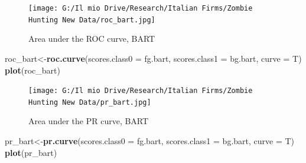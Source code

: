 \documentclass[]{article}
\newenvironment{Shaded}{\begin{snugshade}}{\end{snugshade}}
\newcommand{\CommentTok}[1]{\textcolor[rgb]{0.56,0.35,0.01}{\textit{#1}}}
\newcommand{\DataTypeTok}[1]{\textcolor[rgb]{0.13,0.29,0.53}{#1}}
\newcommand{\DecValTok}[1]{\textcolor[rgb]{0.00,0.00,0.81}{#1}}
\newcommand{\FloatTok}[1]{\textcolor[rgb]{0.00,0.00,0.81}{#1}}
\newcommand{\KeywordTok}[1]{\textcolor[rgb]{0.13,0.29,0.53}{\textbf{#1}}}
\newcommand{\NormalTok}[1]{#1}
\newcommand{\OperatorTok}[1]{\textcolor[rgb]{0.81,0.36,0.00}{\textbf{#1}}}
\newcommand{\StringTok}[1]{\textcolor[rgb]{0.31,0.60,0.02}{#1}}
\begin{document}
\begin{Shaded}
\end{Shaded}

\begin{figure}
\centering
\texttt{[image: G:/Il mio Drive/Research/Italian Firms/Zombie Hunting New Data/roc\_bart.jpg]}
\caption{Area under the ROC curve, BART}
\end{figure}

\begin{Shaded}
\begin{Highlighting}[]
\NormalTok{roc_bart<-}\KeywordTok{roc.curve}\NormalTok{(}\DataTypeTok{scores.class0 =}\NormalTok{ fg.bart,}
                    \DataTypeTok{scores.class1 =}\NormalTok{ bg.bart,}
                    \DataTypeTok{curve =}\NormalTok{ T)}
\KeywordTok{plot}\NormalTok{(roc_bart)}
\end{Highlighting}
\end{Shaded}

\begin{figure}
\centering
\texttt{[image: G:/Il mio Drive/Research/Italian Firms/Zombie Hunting New Data/pr\_bart.jpg]}
\caption{Area under the PR curve, BART}
\end{figure}

\begin{Shaded}
\begin{Highlighting}[]
\NormalTok{pr_bart<-}\KeywordTok{pr.curve}\NormalTok{(}\DataTypeTok{scores.class0 =}\NormalTok{ fg.bart,}
                  \DataTypeTok{scores.class1 =}\NormalTok{ bg.bart,}
                  \DataTypeTok{curve =}\NormalTok{ T)}
\KeywordTok{plot}\NormalTok{(pr_bart)}
\end{Highlighting}
\end{Shaded}

\begin{Shaded}
\end{Shaded}
\end{document}
